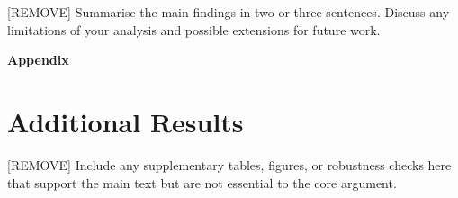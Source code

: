 \documentclass[12pt]{article}
\begin{document}
[REMOVE] Summarise the main findings in two or three sentences.
Discuss any limitations of your analysis and possible extensions for
future work.



\clearpage




\clearpage
\appendix

\begin{center}
{\LARGE \textbf{Appendix}}
\end{center}

\renewcommand{\theequation}{A.\arabic{equation}}%
\renewcommand{\thefigure}{A.\arabic{figure}} \setcounter{figure}{0}
\renewcommand{\thetable}{A.\arabic{table}} \setcounter{table}{0}

\section{Additional Results}\label{app:a}

[REMOVE] Include any supplementary tables, figures, or robustness checks
here that support the main text but are not essential to the core
argument.

\end{document}
